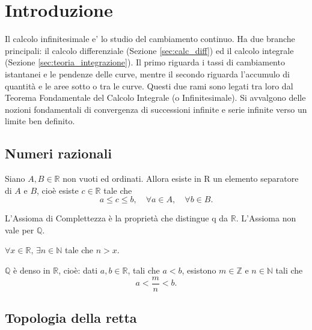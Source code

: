 \section{Introduzione}

Il calcolo infinitesimale e' lo studio del cambiamento continuo. Ha due branche principali: il calcolo differenziale (Sezione \ref{sec:calc_diff}) ed il calcolo integrale (Sezione \ref{sec:teoria_integrazione}). Il primo riguarda i tassi di cambiamento istantanei e le pendenze delle curve, mentre il secondo riguarda l'accumulo di quantità e le aree sotto o tra le curve. Questi due rami sono legati tra loro dal Teorema Fondamentale del Calcolo Integrale (o Infinitesimale). Si avvalgono delle nozioni fondamentali di convergenza di successioni infinite e serie infinite verso un limite ben definito.

\subsection{Numeri razionali}

\begin{theorem}\label{th:assioma_completezza}
    Siano $A,B\in\mathbb{R}$ non vuoti ed ordinati. Allora esiste in \gls{R} un elemento separatore di $A$ e $B$, cioè esiste $c\in\mathbb{R}$ tale che
    \begin{equation*}
        a\leq c\leq b, \quad\forall a\in A, \quad\forall b\in B.
    \end{equation*}
\end{theorem}

L'Assioma di Complettezza è la proprietà che distingue \gls{q} da $\mathbb{R}$. L'Assioma non vale per $\mathbb{Q}$.

\begin{property}
    $\forall x\in\mathbb{R},\,\exists n\in\mathbb{N}$ tale che $n>x$.
\end{property}

\begin{proposition}
    $\mathbb{Q}$ è denso in $\mathbb{R}$, cioè: dati $a,b\in\mathbb{R}$, tali che $a<b$, esistono $m\in\mathbb{Z}$ e $n\in\mathbb{N}$ tali che
    \begin{equation*}
        a<\frac{m}{n}<b.
    \end{equation*}
\end{proposition}

\subsection{Topologia della retta}

